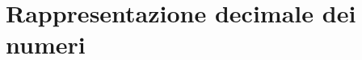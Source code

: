 \documentclass[onecolumn,11pt]{book}
\newcommand{\rpr}{\textsf{R}~}
\begin{document}
 

\section{Rappresentazione decimale dei numeri}
\end{document}
